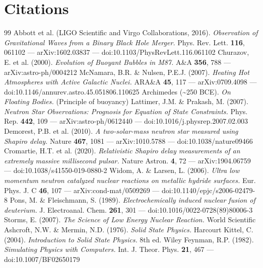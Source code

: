 \documentclass[12pt,a4paper]{article}
\begin{document}
\section*{Citations}
\begin{thebibliography}{99}
 Abbott et al. (LIGO Scientific and Virgo Collaborations, 2016). \emph{Observation of Gravitational Waves from a Binary Black Hole Merger.} Phys. Rev. Lett. \textbf{116}, 061102 --- arXiv:1602.03837 --- doi:10.1103/PhysRevLett.116.061102
 Churazov, E. et al. (2000). \emph{Evolution of Buoyant Bubbles in M87.} A\&A \textbf{356}, 788 --- arXiv:astro-ph/0004212
 McNamara, B.R. \& Nulsen, P.E.J. (2007). \emph{Heating Hot Atmospheres with Active Galactic Nuclei.} ARA\&A \textbf{45}, 117 --- arXiv:0709.4098 --- doi:10.1146/annurev.astro.45.051806.110625
 Archimedes (\textasciitilde{}250 BCE). \emph{On Floating Bodies.} (Principle of buoyancy)
 Lattimer, J.M. \& Prakash, M. (2007). \emph{Neutron Star Observations: Prognosis for Equation of State Constraints.} Phys. Rep. \textbf{442}, 109 --- arXiv:astro-ph/0612440 --- doi:10.1016/j.physrep.2007.02.003
 Demorest, P.B. et al. (2010). \emph{A two-solar-mass neutron star measured using Shapiro delay.} Nature \textbf{467}, 1081 --- arXiv:1010.5788 --- doi:10.1038/nature09466
 Cromartie, H.T. et al. (2020). \emph{Relativistic Shapiro delay measurements of an extremely massive millisecond pulsar.} Nature Astron. \textbf{4}, 72 --- arXiv:1904.06759 --- doi:10.1038/s41550-019-0880-2
 Widom, A. \& Larsen, L. (2006). \emph{Ultra low momentum neutron catalyzed nuclear reactions on metallic hydride surfaces.} Eur. Phys. J. C \textbf{46}, 107 --- arXiv:cond-mat/0509269 --- doi:10.1140/epjc/s2006-02479-8
 Pons, M. \& Fleischmann, S. (1989). \emph{Electrochemically induced nuclear fusion of deuterium.} J. Electroanal. Chem. \textbf{261}, 301 --- doi:10.1016/0022-0728(89)80006-3
 Storms, E. (2007). \emph{The Science of Low Energy Nuclear Reaction.} World Scientific
 Ashcroft, N.W. \& Mermin, N.D. (1976). \emph{Solid State Physics.} Harcourt
 Kittel, C. (2004). \emph{Introduction to Solid State Physics.} 8th ed. Wiley
 Feynman, R.P. (1982). \emph{Simulating Physics with Computers.} Int. J. Theor. Phys. \textbf{21}, 467 --- doi:10.1007/BF02650179
\end{thebibliography}
\end{document}
